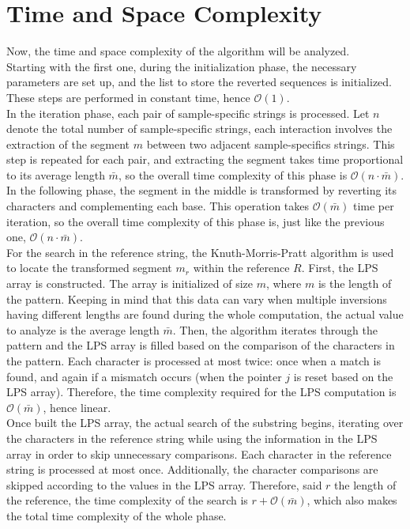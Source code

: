 \section{Time and Space Complexity}
Now, the time and space complexity of the algorithm will be analyzed. \\
Starting with the first one, during the initialization phase, the necessary parameters are set up, and the list to store the reverted sequences is initialized. These steps are performed in constant time, hence $\mathcal{O}(1)$. \\

In the iteration phase, each pair of sample-specific strings is processed. Let \( n \) denote the total number of sample-specific strings, each interaction involves the extraction of the segment \( m \) between two adjacent sample-specifics strings. This step is repeated for each pair, and extracting the segment takes time proportional to its average length $\bar{m}$, so the overall time complexity of this phase is $\mathcal{O}(n \cdot \bar{m} )$. \\

In the following phase, the segment in the middle is transformed by reverting its characters and complementing each base. This operation takes $\mathcal{O}( \bar{m})$ time per iteration, so the overall time complexity of this phase is, just like the previous one, $\mathcal{O}(n \cdot \bar{m} )$. \\

For the search in the reference string, the Knuth-Morris-Pratt algorithm is used to locate the transformed segment \( m_r \) within the reference \( R \). First, the LPS array is constructed. The array is initialized of size \( m \), where \( m \) is the length of the pattern. Keeping in mind that this data can vary when multiple inversions having different lengths are found during the whole computation, the actual value to analyze is the average length \( \bar{m} \).  Then, the algorithm iterates through the pattern and the LPS array is filled based on the comparison of the characters in the pattern. Each character is processed at most twice: once when a match is found, and again if a mismatch occurs (when the pointer \( j \) is reset based on the LPS array). Therefore, the time complexity required for the LPS computation is $\mathcal{O}(\bar{m})$, hence linear. \\
Once built the LPS array, the actual search of the substring begins, iterating over the characters in the reference string while using the information in the LPS array in order to skip unnecessary comparisons. Each character in the reference string is processed at most once. Additionally, the character comparisons are skipped according to the values in the LPS array. Therefore, said \( r \) the length of the reference, the time complexity of the search is  $r + \mathcal{O}(\bar{m})$, which also makes the total time complexity of the whole phase. \\

